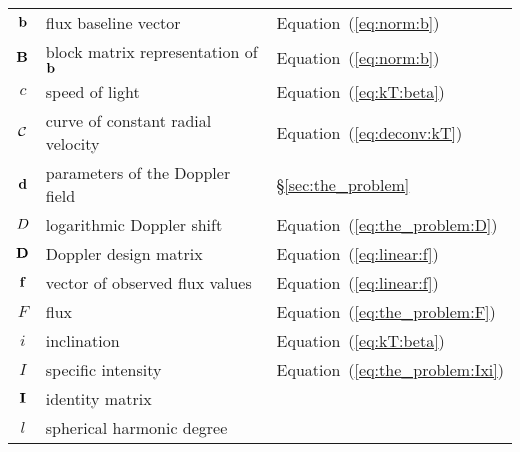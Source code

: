\documentclass[modern]{aastex631}
\begin{document}
\begin{center}
\begin{longtable}{cll}
        ${\mathbf{b}}$                                          & flux baseline vector                                         & Equation~(\ref{eq:norm:b})                 \\
        ${\mathbf{B}}$                                          & block matrix representation of ${\mathbf{b}}$                    & Equation~(\ref{eq:norm:b})                 \\
        $c$                                                 & speed of light                                               & Equation~(\ref{eq:kT:beta})                \\
        $\mathcal{C}$                                            & curve of constant radial velocity                            & Equation~(\ref{eq:deconv:kT})              \\
        ${\mathbf{d}}$                                            & parameters of the Doppler field                              & \S\ref{sec:the_problem}                    \\
        $D$                                                & logarithmic Doppler shift                                    & Equation~(\ref{eq:the_problem:D})          \\
        ${\mathbf{D}}$                                          & Doppler design matrix                                        & Equation~(\ref{eq:linear:f})               \\
        ${\mathbf{f}}$                                          & vector of observed flux values                               & Equation~(\ref{eq:linear:f})               \\
        $F$                                                 & flux                                                         & Equation~(\ref{eq:the_problem:F})          \\
        $i$                                                 & inclination                                                  & Equation~(\ref{eq:kT:beta})                \\
        $I$                                                 & specific intensity                                           & Equation~(\ref{eq:the_problem:Ixi})        \\
        ${\mathbf{I}}$                                          & identity matrix                                              &                                            \\
        $l$                                                 & spherical harmonic degree                                    &                                            \\

\end{longtable}
\end{center}
\end{document}
